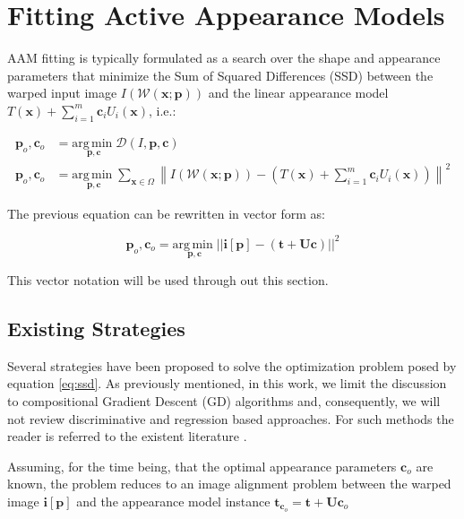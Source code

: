 \section{Fitting Active Appearance Models}
\label{sec:fit}

AAM fitting is typically formulated as a search over the shape and appearance parameters that minimize the Sum of Squared Differences (SSD) between the warped input image $I(\mathcal{W}(\mathbf{x}; \mathbf{p}))$ and the linear appearance model $T(\mathbf{x}) + \sum_{i=1}^m \mathbf{c}_i U_i(\mathbf{x})$, i.e.: 

\begin{align}
\mathbf{p}_o, \mathbf{c}_o & = \underset{\mathbf{p}, \mathbf{c}}{\mathrm{arg\,min\;}}
\mathcal{D}(I, \mathbf{p}, \mathbf{c})
\\
\mathbf{p}_o, \mathbf{c}_o & = \underset{\mathbf{p}, \mathbf{c}}{\mathrm{arg\,min\;}} 
\sum_{\mathbf{x} \in \Omega} \left\| I(\mathcal{W}(\mathbf{x}; \mathbf{p})) - \left( T(\mathbf{x}) + \sum_{i=1}^m \mathbf{c}_i U_i(\mathbf{x}) \right) \right\|^2 
\end{align}

The previous equation can be rewritten in vector form as:

\begin{equation}
\mathbf{p}_o, \mathbf{c}_o = \underset{\mathbf{p}, \mathbf{c}}{\mathrm{arg\,min\;}} 
|| \mathbf{i}[\mathbf{p}] - (\mathbf{t} + \mathbf{U} \mathbf{c}) ||^2 
\label{eq:ssd}
\end{equation}

This vector notation will be used through out this section.

\subsection{Existing Strategies}

Several strategies have been proposed to solve the optimization problem posed by equation \ref{eq:ssd}. As previously mentioned, in this work, we limit the discussion to compositional Gradient Descent (GD) algorithms \cite{} and, consequently, we will not review discriminative and regression based approaches. For such methods the reader is referred
to the existent literature \cite{}.

Assuming, for the time being, that the optimal appearance parameters $\mathbf{c}_o$ are known, the problem reduces to an image alignment problem between the warped image $\mathbf{i}[\mathbf{p}]$ and the appearance model instance $\mathbf{t}_{\mathbf{c}_o} = \mathbf{t} + \mathbf{U} \mathbf{c}_o$

